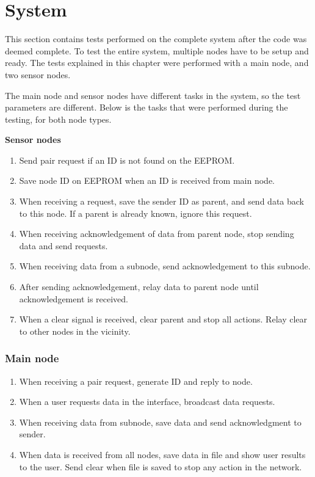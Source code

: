 \section{System}
This section contains tests performed on the complete system after the code was deemed complete. To test the entire system, multiple nodes have to be setup and ready. The tests explained in this chapter were performed with a main node, and two sensor nodes.

The main node and sensor nodes have different tasks in the system, so the test parameters are different. Below is the tasks that were performed during the testing, for both node types.

\textbf{Sensor nodes} \\
\begin{enumerate}
\item Send pair request if an ID is not found on the EEPROM.
\item Save node ID on EEPROM when an ID is received from main node.
\item When receiving a request, save the sender ID as parent, and send data back to this node. If a parent is already known, ignore this request.
\item When receiving acknowledgement of data from parent node, stop sending data and send requests.
\item When receiving data from a subnode, send acknowledgement to this subnode.
\item After sending acknowledgement, relay data to parent node until acknowledgement is received.
\item When a clear signal is received, clear parent and stop all actions. Relay clear to other nodes in the vicinity.
\end{enumerate}


\subsubsection*{Main node}
\begin{enumerate}
\item When receiving a pair request, generate ID and reply to node.
\item When a user requests data in the interface, broadcast data requests.
\item When receiving data from subnode, save data and send acknowledgment to sender.
\item When data is received from all nodes, save data in file and show user results to the user. Send clear when file is saved to stop any action in the network.
\end{enumerate}

